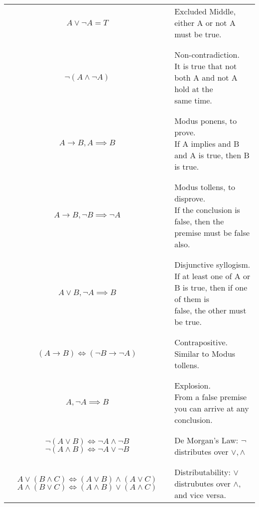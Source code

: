 \documentclass{article}
\newcommand{\false}{{\mathfrak{f}}}
\begin{document}
\begin{table}[H]
    \centering
    \large
    \begin{tabular}{c l}
        $A \vee \lnot A = T$ & Excluded Middle, either A or not A must be true.\\
        &\\
        \hline
        &\\
        $\lnot (A \wedge \lnot A)$ & \makecell[l]{
            Non-contradiction.\\ It is true that not both A and not A hold at the \\same time. 
        }\\
        &\\
        \hline
        &\\
        $A \rightarrow B, A \implies B$ & \makecell[l]{Modus ponens, to prove. \\
        If A implies and B and A is true, then B is true.}\\
        &\\
        \hline
        &\\
        $A \rightarrow B, \lnot B \implies \lnot A$ & \makecell[l]{Modus tollens, to disprove. \\
        If the conclusion is false, then the premise must be false also.}\\
        &\\
        \hline
        &\\
        $A \vee B, \lnot A \implies B$ & \makecell[l]{
            Disjunctive syllogism.\\
            If at least one of A or B is true, then if one of them is \\false, the other must be true.
        }\\
        &\\
        \hline
        &\\
        $(A \rightarrow B) \iff (\lnot B \rightarrow \lnot A)$ & Contrapositive. Similar to Modus tollens.\\
        &\\
        \hline
        &\\
        $A, \lnot A \implies B$ & \makecell[l]{
            Explosion. \\
            From a false premise you can arrive at any conclusion.
        }\\
        &\\
        \hline
        &\\
        \makecell{
            $\lnot (A \vee B) \iff \lnot A \wedge \lnot B$\\
            $\lnot (A \wedge B) \iff \lnot A \vee \lnot B$
        } & De Morgan's Law: $\lnot$ distributes over $\vee, \wedge$\\
        &\\
        \hline
        &\\
        \makecell{
            $A \vee (B \wedge C) \iff (A\vee B) \wedge (A \vee C)$\\
            $A \wedge (B \vee C) \iff (A \wedge B)\vee (A \wedge C)$
        } & Distributability: $\vee$ distrubutes over $\wedge$, and vice versa.


\end{tabular}
\end{table}
\end{document}
